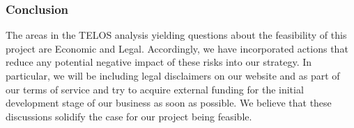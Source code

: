 \documentclass[main.tex]{subfiles}
\begin{document}
\subsubsection{Conclusion}

The areas in the TELOS analysis yielding questions about the feasibility of this project are Economic and Legal. Accordingly, we have incorporated actions that reduce any potential negative impact of these risks into our strategy. In particular, we will be including legal disclaimers on our website and as part of our terms of service and try to acquire external funding for the initial development stage of our business as soon as possible. We believe that these discussions solidify the case for our project being feasible.
\end{document}

